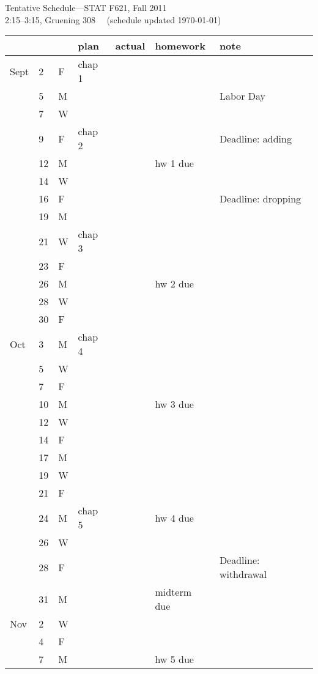 \documentclass{article}
\begin{document}
\begin{center}
{\Large Tentative Schedule---STAT F621, Fall 2011}\\[2mm]
2:15--3:15, Gruening  308 \ \ (schedule updated \today)
\end{center}
\bigskip
\thispagestyle{empty}

\renewcommand\arraystretch{1.06}
\hskip-6mm
\begin{tabular*}{0.99\textwidth}{%
    p{}%
    p{}%
    p{}%
    |p{}%
    |p{}%
    |p{}%
    |p{}}
\hline
& & & plan & actual & homework & note\\
\hline
Sept
& 2 & F & chap 1& & & \\
\hline
& 5 & M & & & & Labor Day\\
& 7 & W & & & & \\
& 9 & F & chap 2& & & Deadline: adding\\
\hline
& 12 & M & & & hw 1 due& \\
& 14 & W & & & & \\
& 16 & F & & & & Deadline: dropping\\
\hline
& 19 & M & & & & \\
& 21 & W & chap 3& & & \\
& 23 & F & & & & \\
\hline
& 26 & M & & & hw 2 due& \\
& 28 & W & & & & \\
& 30 & F & & & & \\
\hline
Oct
& 3 & M & chap 4& & & \\
& 5 & W & & & & \\
& 7 & F & & & & \\
\hline
& 10 & M & & & hw 3 due& \\
& 12 & W & & & & \\
& 14 & F & & & & \\
\hline
& 17 & M & & & & \\
& 19 & W & & & & \\
& 21 & F & & & & \\
\hline
& 24 & M & chap 5& & hw 4 due&\\
& 26 & W & & & & \\
& 28 & F & & & & Deadline: withdrawal\\
\hline
& 31 & M & & & midterm due& \\
Nov
& 2 & W & & & & \\
& 4 & F & & & & \\
\hline
& 7 & M & & & hw 5 due&\\

\end{tabular*}
\end{document}
